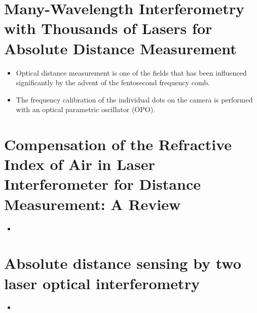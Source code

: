 \fi 

\iftrue 
    \section{Many-Wavelength Interferometry with Thousands of Lasers for Absolute Distance Measurement \cite{vanDenBerg:prl:2012}}
        \begin{itemize}
            \item Optical distance measurement is one of the fields that has been influenced significantly by the advent of the fentosecond frequency comb. 
            \item The frequency calibration of the individual dots on the camera is performed with an optical parametric oscillator (OPO). 
        \end{itemize}

    \section{Compensation of the Refractive Index of Air in Laser Interferometer for Distance Measurement: A Review \cite{jang:ipem:2017}}
        \begin{itemize}
            \item 
        \end{itemize} 

    \section{Absolute distance sensing by two laser optical interferometry \cite{klaus:rsi:2013}}
        \begin{itemize}
            \item 
        \end{itemize}
\fi 
    

\newpage
\printbibliography[title=Bibliography]

